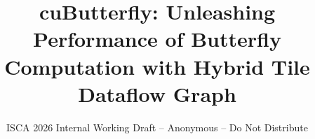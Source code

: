 \documentclass[conference]{IEEEtran}
\begin{document}

\title{cuButterfly: Unleashing Performance of Butterfly Computation with Hybrid Tile Dataflow Graph}
\author{\normalsize{ISCA 2026 Internal Working Draft -- Anonymous -- Do Not Distribute}}

\maketitle
\thispagestyle{plain}
\pagestyle{plain}


\suppressfloats[t]










{\scriptsize


}
\end{document}
